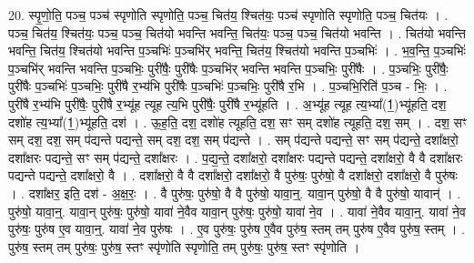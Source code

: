 \documentclass[17pt]{extarticle}
\begin{document}
20. स्पृ॒णो॒ति॒ पञ्च॒ पञ्च॑ स्पृणोति स्पृणोति॒ पञ्च॒ चित॑य॒ श्चित॑यः॒ पञ्च॑ स्पृणोति स्पृणोति॒ पञ्च॒ चित॑यः । . पञ्च॒ चित॑य॒ श्चित॑यः॒ पञ्च॒ पञ्च॒ चित॑यो भवन्ति भवन्ति॒ चित॑यः॒ पञ्च॒ पञ्च॒ चित॑यो भवन्ति । . चित॑यो भवन्ति भवन्ति॒ चित॑य॒ श्चित॑यो भवन्ति प॒ञ्चभिः॑ प॒ञ्चभि॑र् भवन्ति॒ चित॑य॒ श्चित॑यो भवन्ति प॒ञ्चभिः॑ । . भ॒व॒न्ति॒ प॒ञ्चभिः॑ प॒ञ्चभि॑र् भवन्ति भवन्ति प॒ञ्चभिः॒ पुरी॑षैः॒ पुरी॑षैः प॒ञ्चभि॑र् भवन्ति भवन्ति प॒ञ्चभिः॒ पुरी॑षैः । . प॒ञ्चभिः॒ पुरी॑षैः॒ पुरी॑षैः प॒ञ्चभिः॑ प॒ञ्चभिः॒ पुरी॑षै र॒भ्य॑भि पुरी॑षैः प॒ञ्चभिः॑ प॒ञ्चभिः॒ पुरी॑षै र॒भि । . प॒ञ्चभि॒रिति॑ प॒ञ्च - भिः॒ । . पुरी॑षै र॒भ्य॑भि पुरी॑षैः॒ पुरी॑षै र॒भ्यू॑ह त्यूह त्य॒भि पुरी॑षैः॒ पुरी॑षै र॒भ्यू॑हति । . अ॒भ्यू॑ह त्यूह त्य॒भ्या᳚(1॒)भ्यू॑हति॒ दश॒ दशो॑ह त्य॒भ्या᳚(1॒)भ्यू॑हति॒ दश॑ । . ऊ॒ह॒ति॒ दश॒ दशो॑ह त्यूहति॒ दश॒ सꣳ सम् दशो॑ह त्यूहति॒ दश॒ सम् । . दश॒ सꣳ सम् दश॒ दश॒ सम् प॑द्यन्ते पद्यन्ते॒ सम् दश॒ दश॒ सम् प॑द्यन्ते । . सम् प॑द्यन्ते पद्यन्ते॒ सꣳ सम् प॑द्यन्ते॒ दशा᳚क्षरो॒ दशा᳚क्षरः पद्यन्ते॒ सꣳ सम् प॑द्यन्ते॒ दशा᳚क्षरः । . प॒द्य॒न्ते॒ दशा᳚क्षरो॒ दशा᳚क्षरः पद्यन्ते पद्यन्ते॒ दशा᳚क्षरो॒ वै वै दशा᳚क्षरः पद्यन्ते पद्यन्ते॒ दशा᳚क्षरो॒ वै । . दशा᳚क्षरो॒ वै वै दशा᳚क्षरो॒ दशा᳚क्षरो॒ वै पुरु॑षः॒ पुरु॑षो॒ वै दशा᳚क्षरो॒ दशा᳚क्षरो॒ वै पुरु॑षः । . दशा᳚क्षर॒ इति॒ दश॑ - अ॒क्ष॒रः॒ । . वै पुरु॑षः॒ पुरु॑षो॒ वै वै पुरु॑षो॒ यावा॒न्॒. यावा॒न् पुरु॑षो॒ वै वै पुरु॑षो॒ यावान्॑ । . पुरु॑षो॒ यावा॒न्॒. यावा॒न् पुरु॑षः॒ पुरु॑षो॒ यावा॑ ने॒वैव यावा॒न् पुरु॑षः॒ पुरु॑षो॒ यावा॑ ने॒व । . यावा॑ ने॒वैव यावा॒न्॒. यावा॑ ने॒व पुरु॑षः॒ पुरु॑ष ए॒व यावा॒न्॒. यावा॑ ने॒व पुरु॑षः । . ए॒व पुरु॑षः॒ पुरु॑ष ए॒वैव पुरु॑ष॒ स्तम् तम् पुरु॑ष ए॒वैव पुरु॑ष॒ स्तम् । . पुरु॑ष॒ स्तम् तम् पुरु॑षः॒ पुरु॑ष॒ स्तꣳ स्पृ॑णोति स्पृणोति॒ तम् पुरु॑षः॒ पुरु॑ष॒ स्तꣳ स्पृ॑णोति । \newline
\end{document}
